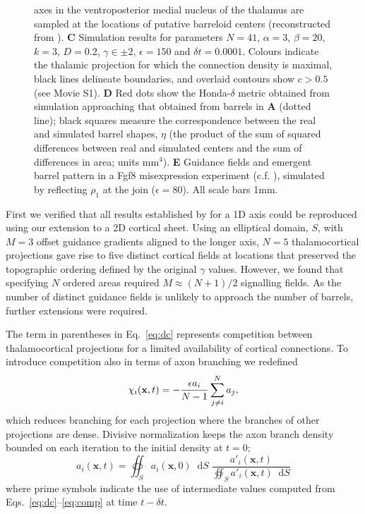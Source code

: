 \documentclass[9pt,lineno]{elife}
\newcommand*\dif{\mathop{}\!\mathrm{d}}
\begin{document}
\begin{figure}
\begin{fullwidth}
{  axes in the ventroposterior medial nucleus of the thalamus are sampled at
  the locations of putative barreloid centers (reconstructed from
  \cite{haidarliu_size_2001}). \textbf{C} Simulation results for parameters
  $N=41$, $\alpha=3$, $\beta=20$, $k=3$, $D=0.2$, $\gamma\in\pm 2$,
  $\epsilon=150$ and $\delta{t}=0.0001$. Colours indicate the thalamic
  projection for which the connection density is maximal, black lines
  delineate boundaries, and overlaid contours show $c>0.5$ (see Movie
  S1). \textbf{D} Red dots show the Honda-$\delta$ metric obtained from
  simulation approaching that obtained from barrels in \textbf{A} (dotted
  line); black squares measure the correspondence between the real and
  simulated barrel shapes, $\eta$ (the product of the sum of squared
  differences between real and simulated centers and the sum of differences in
  area; units mm$^4$). \textbf{E} Guidance fields and emergent barrel pattern
  in a Fgf8 misexpression experiment
  (c.f. \cite{assimacopoulos_fibroblast_2012}), simulated by reflecting
  $\rho_1$ at the join ($\epsilon=80$). All scale bars 1mm.}
\label{fig:main}
\end{fullwidth}
\end{figure}

First we verified that all results established by \cite{karbowski_model_2004}
for a 1D axis could be reproduced using our extension to a 2D cortical
sheet. Using an elliptical domain, $S$, with $M=3$ offset guidance gradients
aligned to the longer axis, $N=5$ thalamocortical projections gave rise to
five distinct cortical fields at locations that preserved the topographic
ordering defined by the original $\gamma$ values. However, we found that
specifying $N$ ordered areas required $M\approx (N+1)/2$ signalling fields. As
the number of distinct guidance fields is unlikely to approach the number of
barrels, further extensions were required.

The term in parentheses in Eq.~\ref{eq:dc} represents competition between
thalamocortical projections for a limited availability of cortical
connections. To introduce competition also in terms of axon branching we
redefined
%
\begin{equation} \label{eq:comp}
\chi_i(\mathbf{x}, t) = - \frac{\epsilon  a_i}{N-1} \sum_{j \ne i}^{N} a_{j},
\end{equation}
%
which reduces branching for each projection where the branches of other
projections are dense. Divisive normalization keeps the axon branch density
bounded on each iteration to the initial density at $t=0$;
%
\begin{equation} \label{eq:norm}
  a_i(\mathbf{x}, t) = \oiint_{S}  a_i(\mathbf{x}, 0) \dif S \; \frac {a'_i(\mathbf{x}, t)} {\oiint_{S}
  a'_i(\mathbf{x}, t) \dif S}
\end{equation}
%
where prime symbols indicate the use of intermediate values computed from
Eqs.~\ref{eq:dc}--\ref{eq:comp} at time $t-{\delta}t$. 
\end{document}

